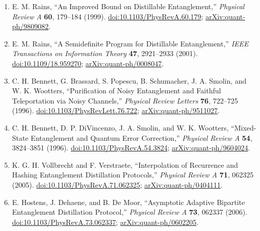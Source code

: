 \begin{enumerate}[label={},leftmargin=4.8em,labelsep=0.5em]
  \scriptsize
  \item[\textup{[Rai99]}]\label{ref:p3-rains-1999}
  E. M. Rains, ``An Improved Bound on Distillable Entanglement,''
  \emph{Physical Review A} \textbf{60}, 179--184 (1999).
  \href{https://doi.org/10.1103/PhysRevA.60.179}{doi:10.1103/PhysRevA.60.179};
  \href{https://arxiv.org/abs/quant-ph/9809082}{arXiv:quant-ph/9809082}.

  \item[\textup{[Rai01]}]\label{ref:p3-rains-2001}
  E. M. Rains, ``A Semidefinite Program for Distillable Entanglement,''
  \emph{IEEE Transactions on Information Theory} \textbf{47}, 2921--2933
  (2001). \href{https://doi.org/10.1109/18.959270}{doi:10.1109/18.959270};
  \href{https://arxiv.org/abs/quant-ph/0008047}{arXiv:quant-ph/0008047}.

  \item[\textup{[BBP+96]}]\label{ref:p3-bennett-prl}
  C. H. Bennett, G. Brassard, S. Popescu, B. Schumacher, J. A. Smolin, and
  W. K. Wootters, ``Purification of Noisy Entanglement and Faithful
  Teleportation via Noisy Channels,'' \emph{Physical Review Letters}
  \textbf{76}, 722--725 (1996).
  \href{https://doi.org/10.1103/PhysRevLett.76.722}{doi:10.1103/PhysRevLett.76.722};
  \href{https://arxiv.org/abs/quant-ph/9511027}{arXiv:quant-ph/9511027}.

  \item[\textup{[BDSW96]}]\label{ref:p3-bennett-pra}
  C. H. Bennett, D. P. DiVincenzo, J. A. Smolin, and W. K. Wootters,
  ``Mixed-State Entanglement and Quantum Error Correction,''
  \emph{Physical Review A} \textbf{54}, 3824--3851 (1996).
  \href{https://doi.org/10.1103/PhysRevA.54.3824}{doi:10.1103/PhysRevA.54.3824};
  \href{https://arxiv.org/abs/quant-ph/9604024}{arXiv:quant-ph/9604024}.

  \item[\textup{[VV05]}]\label{ref:p3-vollbrecht}
  K. G. H. Vollbrecht and F. Verstraete, ``Interpolation of Recurrence and
  Hashing Entanglement Distillation Protocols,'' \emph{Physical Review A}
  \textbf{71}, 062325 (2005).
  \href{https://doi.org/10.1103/PhysRevA.71.062325}{doi:10.1103/PhysRevA.71.062325};
  \href{https://arxiv.org/abs/quant-ph/0404111}{arXiv:quant-ph/0404111}.

  \item[\textup{[HDM06]}]\label{ref:p3-hostens}
  E. Hostens, J. Dehaene, and B. De Moor, ``Asymptotic Adaptive Bipartite
  Entanglement Distillation Protocol,'' \emph{Physical Review A} \textbf{73},
  062337 (2006).
  \href{https://doi.org/10.1103/PhysRevA.73.062337}{doi:10.1103/PhysRevA.73.062337};
  \href{https://arxiv.org/abs/quant-ph/0602205}{arXiv:quant-ph/0602205}.


\end{enumerate}
